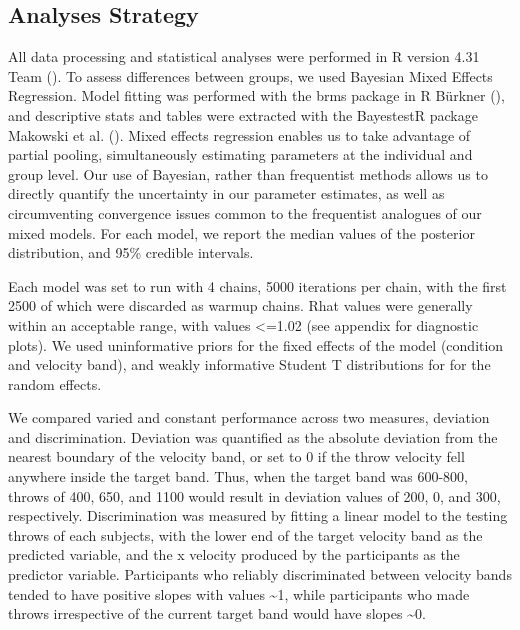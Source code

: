 \documentclass[
  letterpaper,
  DIV=11,
  numbers=noendperiod,
  oneside]{scrartcl}
\begin{document}
\subsection{Analyses Strategy}\label{analyses-strategy}

All data processing and statistical analyses were performed in R version
4.31 Team
(). To
assess differences between groups, we used Bayesian Mixed Effects
Regression. Model fitting was performed with the brms package in R
Bürkner (), and
descriptive stats and tables were extracted with the BayestestR package
Makowski et al.
(). Mixed
effects regression enables us to take advantage of partial pooling,
simultaneously estimating parameters at the individual and group level.
Our use of Bayesian, rather than frequentist methods allows us to
directly quantify the uncertainty in our parameter estimates, as well as
circumventing convergence issues common to the frequentist analogues of
our mixed models. For each model, we report the median values of the
posterior distribution, and 95\% credible intervals.

Each model was set to run with 4 chains, 5000 iterations per chain, with
the first 2500 of which were discarded as warmup chains. Rhat values
were generally within an acceptable range, with values \textless=1.02
(see appendix for diagnostic plots). We used uninformative priors for
the fixed effects of the model (condition and velocity band), and weakly
informative Student T distributions for for the random effects.

We compared varied and constant performance across two measures,
deviation and discrimination. Deviation was quantified as the absolute
deviation from the nearest boundary of the velocity band, or set to 0 if
the throw velocity fell anywhere inside the target band. Thus, when the
target band was 600-800, throws of 400, 650, and 1100 would result in
deviation values of 200, 0, and 300, respectively. Discrimination was
measured by fitting a linear model to the testing throws of each
subjects, with the lower end of the target velocity band as the
predicted variable, and the x velocity produced by the participants as
the predictor variable. Participants who reliably discriminated between
velocity bands tended to have positive slopes with values
\textasciitilde1, while participants who made throws irrespective of the
current target band would have slopes \textasciitilde0.
\end{document}
